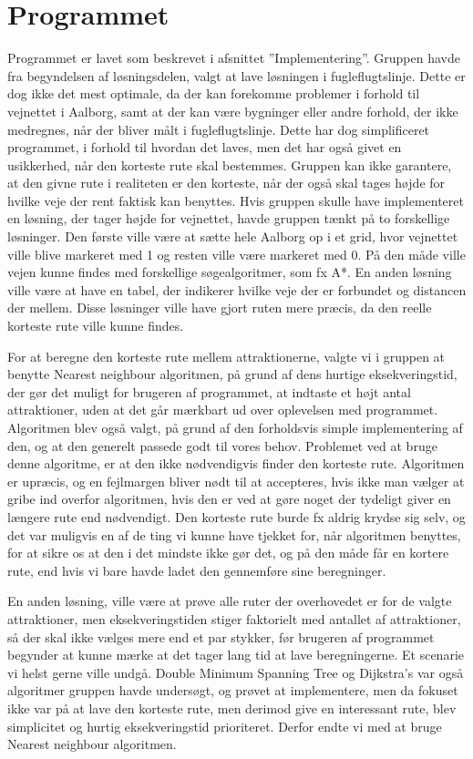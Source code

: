 \section{Programmet}
Programmet er lavet som beskrevet i afsnittet ”Implementering”. Gruppen havde fra begyndelsen af løsningsdelen, valgt at lave løsningen i fugleflugtslinje. Dette er dog ikke det mest optimale, da der kan forekomme problemer i forhold til vejnettet i Aalborg, samt at der kan være bygninger eller andre forhold, der ikke medregnes, når der bliver målt i fugleflugtslinje. Dette har dog simplificeret programmet, i forhold til hvordan det laves, men det har også givet en usikkerhed, når den korteste rute skal bestemmes. Gruppen kan ikke garantere, at den givne rute i realiteten er den korteste, når der også skal tages højde for hvilke veje der rent faktisk kan benyttes. \newline
Hvis gruppen skulle have implementeret en løsning, der tager højde for vejnettet, havde gruppen tænkt på to forskellige løsninger. Den første ville være at sætte hele Aalborg op i et grid, hvor vejnettet ville blive markeret med 1 og resten ville være markeret med 0. På den måde ville vejen kunne findes med forskellige søgealgoritmer, som fx A*. En anden løsning ville være at have en tabel, der indikerer hvilke veje der er forbundet og distancen der mellem. Disse løsninger ville have gjort ruten mere præcis, da den reelle korteste rute ville kunne findes. 

For at beregne den korteste rute mellem attraktionerne, valgte vi i gruppen at benytte Nearest neighbour algoritmen, på grund af dens hurtige eksekveringstid, der gør det muligt for brugeren af programmet, at indtaste et højt antal attraktioner, uden at det går mærkbart ud over oplevelsen med programmet. Algoritmen blev også valgt, på grund af den forholdsvis simple implementering af den, og at den generelt passede godt til vores behov. Problemet ved at bruge denne algoritme, er at den ikke nødvendigvis finder den korteste rute. Algoritmen er upræcis, og en fejlmargen bliver nødt til at accepteres, hvis ikke man vælger at gribe ind overfor algoritmen, hvis den er ved at gøre noget der tydeligt giver en længere rute end nødvendigt. Den korteste rute burde fx aldrig krydse sig selv, og det var muligvis en af de ting vi kunne have tjekket for, når algoritmen benyttes, for at sikre os at den i det mindste ikke gør det, og på den måde får en kortere rute, end hvis vi bare havde ladet den gennemføre sine beregninger. 

En anden løsning, ville være at prøve alle ruter der overhovedet er for de valgte attraktioner, men eksekveringstiden stiger faktorielt med antallet af attraktioner, så der skal ikke vælges mere end et par stykker, før brugeren af programmet begynder at kunne mærke at det tager lang tid at lave beregningerne. Et scenarie vi helst gerne ville undgå.
Double Minimum Spanning Tree og Dijkstra’s var også algoritmer gruppen havde undersøgt, og prøvet at implementere, men da fokuset ikke var på at lave den korteste rute, men derimod give en interessant rute, blev simplicitet og hurtig eksekveringstid prioriteret. Derfor endte vi med at bruge Nearest neighbour algoritmen.

